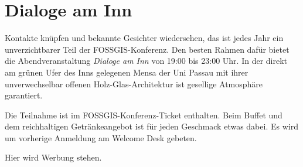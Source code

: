\newpage
\thispagestyle{mensastyle}
\section*{Dialoge am Inn}
\label{social-event}
Kontakte knüpfen und bekannte Gesichter wiedersehen, das ist jedes Jahr ein unverzichtbarer Teil der
FOSSGIS-Konferenz. Den besten Rahmen dafür bietet die Abendveranstaltung \emph{Dialoge am Inn} von 19:00
bis 23:00 Uhr. In der
direkt am grünen Ufer des Inns gelegenen Mensa der Uni Passau mit ihrer unverwechselbar offenen
Holz-Glas-Architektur ist gesellige Atmosphäre garantiert.

Die Teilnahme ist im
FOSSGIS-Konferenz-Ticket enthalten. Beim Buffet und dem reichhaltigen Getränkeangebot ist für jeden
Geschmack etwas dabei. Es wird um vorherige Anmeldung am Welcome Desk gebeten.
\newpage

Hier wird Werbung stehen.

